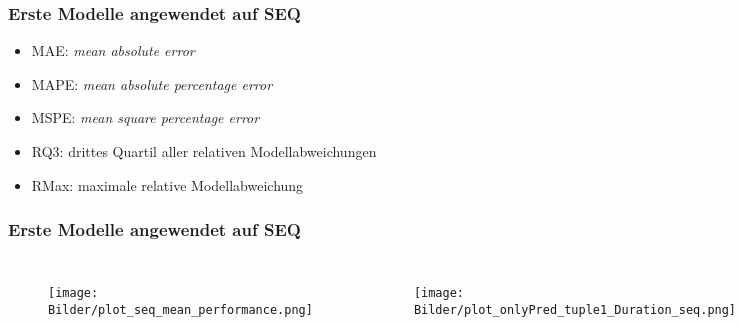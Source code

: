 \documentclass{beamer}
\begin{document}
\begin{frame}
\frametitle{Erste Modelle angewendet auf SEQ}
\begin{table}
\end{table}
\begin{itemize}
\item MAE: \textit{mean absolute error}
\item MAPE: \textit{mean absolute percentage error}
\item MSPE: \textit{mean square percentage error}
\item RQ3: drittes Quartil aller relativen Modellabweichungen
\item RMax: maximale relative Modellabweichung
\end{itemize}
\end{frame}

\begin{frame}
\frametitle{Erste Modelle angewendet auf SEQ}
\begin{columns}
	\begin{figure}
		\texttt{[image: Bilder/plot\_seq\_mean\_performance.png]}
	\end{figure}
	\begin{figure}
		\texttt{[image: Bilder/plot\_onlyPred\_tuple1\_Duration\_seq.png]}
	\end{figure}
	\begin{figure}
		\texttt{[image: Bilder/plot\_seq\_linreg\_Size.png]}
	\end{figure}
	\begin{figure}
		\texttt{[image: Bilder/plot\_onlyPred\_throughput\_ema\_Duration\_seq.png]}
	\end{figure}
\end{columns}
\end{frame}
\end{document}
